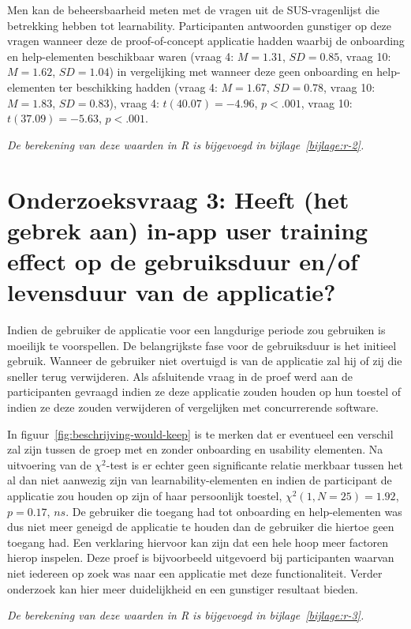 Men kan de beheersbaarheid meten met de vragen uit de SUS-vragenlijst die betrekking hebben tot learnability. Participanten antwoorden gunstiger op deze vragen wanneer deze de proof-of-concept applicatie hadden waarbij de onboarding en help-elementen beschikbaar waren (vraag 4: $M = 1.31$, $SD = 0.85$, vraag 10: $M = 1.62$, $SD = 1.04$) in vergelijking met wanneer deze geen onboarding en help-elementen ter beschikking hadden (vraag 4: $M = 1.67$, $SD = 0.78$, vraag 10: $M = 1.83$, $SD = 0.83$), vraag 4: $t(40.07) = -4.96$, $p < .001$, vraag 10: $t(37.09) = -5.63$, $p < .001$.

\textit{De berekening van deze waarden in R is bijgevoegd in bijlage~\ref{bijlage:r-2}.}

\section[Onderzoeksvraag 3]{Onderzoeksvraag 3: Heeft (het gebrek aan) in-app user training effect op de gebruiksduur en/of levensduur van de applicatie?}
\label{sec:onderzoeksvraag-3}

Indien de gebruiker de applicatie voor een langdurige periode zou gebruiken is moeilijk te voorspellen. De belangrijkste fase voor de gebruiksduur is het initieel gebruik. Wanneer de gebruiker niet overtuigd is van de applicatie zal hij of zij die sneller terug verwijderen. Als afsluitende vraag in de proef werd aan de participanten gevraagd indien ze deze applicatie zouden houden op hun toestel of indien ze deze zouden verwijderen of vergelijken met concurrerende software.

In figuur~\ref{fig:beschrijving-would-keep} is te merken dat er eventueel een verschil zal zijn tussen de groep met en zonder onboarding en usability elementen. Na uitvoering van de $\chi^2$-test is er echter geen significante relatie merkbaar tussen het al dan niet aanwezig zijn van learnability-elementen en indien de participant de applicatie zou houden op zijn of haar persoonlijk toestel, $\chi^2 (1, N = 25) = 1.92$, $p = 0.17$, $ns$. De gebruiker die toegang had tot onboarding en help-elementen was dus niet meer geneigd de applicatie te houden dan de gebruiker die hiertoe geen toegang had. Een verklaring hiervoor kan zijn dat een hele hoop meer factoren hierop inspelen. Deze proef is bijvoorbeeld uitgevoerd bij participanten waarvan niet iedereen op zoek was naar een applicatie met deze functionaliteit. Verder onderzoek kan hier meer duidelijkheid en een gunstiger resultaat bieden.

\textit{De berekening van deze waarden in R is bijgevoegd in bijlage~\ref{bijlage:r-3}.}

